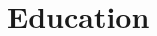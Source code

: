 \documentclass[11pt]{article} %
\begin{document}
\begin{tabularx}{\linewidth}{@{}lR@{}}

\end{tabularx}


\section{Education}
\end{document}
